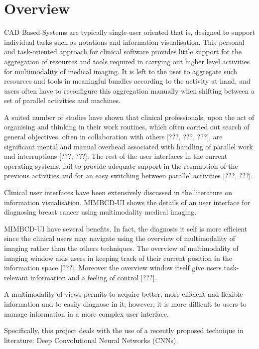 
\chapter{Overview}
\label{chapter:overview}

CAD Based-Systems are typically single-user oriented that is, designed to support individual tasks such as notations and information visualisation. This personal and task-oriented approach for clinical software provides little support for the aggregation of resources and tools required in carrying out higher level activities for multimodality of medical imaging. It is left to the user to aggregate such resources and tools in meaningful bundles according to the activity at hand, and users often have to reconfigure this aggregation manually when shifting between a set of parallel activities and machines.

A  suited  number  of  studies  have  shown  that  clinical  professionals, upon the act of organising and thinking in their work routines, which often carried out search of general objectives, often in collaboration with others [???, ???, ???], are significant mental and manual overhead associated with handling of  parallel  work  and  interruptions [???,  ???]. The rest of the user  interfaces  in  the  current operating systems, fail to provide adequate support in the resumption of the previous  activities  and  for an  easy  switching  between  parallel  activities [???, ???].

Clinical user interfaces have been extensively discussed in the literature on information visualisation. MIMBCD-UI shows the details of an user interface for diagnosing breast cancer using multimodality medical imaging.

MIMBCD-UI have several benefits. In fact, the diagnosis it self is more efficient since the clinical users may navigate using the overview of multimodality of imaging rather than the others techniques. The overview of multimodality of imaging window aids users in keeping track of their current position in the information space [???]. Moreover the overview window itself give users task-relevant information and a feeling of control [???].

A multimodality of views permits to acquire better, more efficient and flexible information and to easily diagnose in it; however, it is more difficult to users to manage information in a more complex user interface.

Specifically, this project deals with the use of a recently proposed technique in literature: Deep Convolutional Neural Networks (CNNs).

